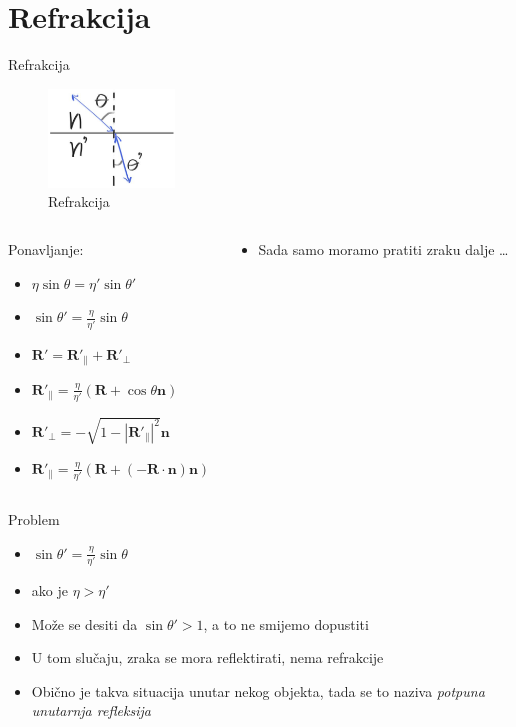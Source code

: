 \documentclass[9pt]{beamer}
\begin{document}
\section{Refrakcija}
\begin{frame}{Refrakcija}
\begin{figure}
	\includegraphics[width=0.3\textwidth]{./slike/ray-refract.png}
	\caption{Refrakcija}
\end{figure}
\begin{columns}
	\begin{column}{0.5\linewidth}
		Ponavljanje:
		\begin{itemize}
			\item $\eta \sin \theta= \eta' \sin \theta'$
			\item $\sin \theta' = \frac{\eta}{\eta'}\sin \theta $
			\item $\mathbf{R'} =\mathbf{R'}_{\parallel} + \mathbf{R'}_{\bot}$
			\item $\mathbf{R'}_{\parallel} = \frac{\eta}{\eta'} (\mathbf{R} + \cos\theta \mathbf{n})$
			\item $\mathbf{R'}_{\bot} = -\sqrt{1 - |\mathbf{R'}_{\parallel}|^2} \mathbf{n}$
			\item $\mathbf{R'}_{\parallel} =
			\frac{\eta}{\eta'} (\mathbf{R} + (\mathbf{-R} \cdot \mathbf{n}) \mathbf{n})$
		\end{itemize}
	\end{column}
	\begin{column}{0.5\linewidth}
		\begin{itemize}
			\item Sada samo moramo pratiti zraku dalje \ldots
		\end{itemize}
	\end{column}
\end{columns}

\end{frame}
\begin{frame}{Problem}
\begin{itemize}
	\item $\sin \theta' = \frac{\eta}{\eta'}\sin \theta $
	\item ako je $\eta > \eta'$
	\item Može se desiti da $\sin \theta' > 1$, a to ne smijemo dopustiti
	\item U tom slučaju, zraka se mora reflektirati, nema refrakcije
	\item Obično je takva situacija unutar nekog objekta, tada se to naziva \textit{potpuna unutarnja refleksija}
\end{itemize}
\end{frame}
\end{document}
